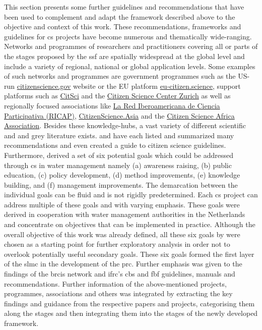 This section presents some further guidelines and recommendations that have been used to complement and adapt the framework described above to the objective and context of this work. These recommendations, frameworks and guidelines for \acrlong{cs} projects have become numerous and thematically wide-ranging. Networks and programmes of researchers and practitioners covering all or parts of the stages proposed by the \acrshort{ssf} are spatially widespread at the global level and include a variety of regional, national or global application levels. Some examples of such networks and programmes are government programmes such as the US-run \href{https://www.citizenscience.gov/}{citizenscience.gov} website or the EU platform \href{https://eu-citizen.science/}{eu-citizen.science}, support platforms such as \href{https://citsci.org/}{CitSci} and the \href{https://citizenscience.ch/en/}{Citizen Science Center Zurich} as well as regionally focused associations like \href{http://cienciaparticipativa.net/la-ricap/}{La Red Iberoamericana de Ciencia Participativa (RICAP)}, \href{https://citizenscience.asia/}{CitizenScience.Asia} and the \href{https://www.usiu.ac.ke/citsci-africa-association/}{Citizen Science Africa Association}.\newline
Besides these knowledge-hubs, a vast variety of different scientific and and grey literature exists. \Textcite{fraislCitizenScienceEnvironmental2022} and \textcite{westonCommunityBasedWaterMonitoring2015} have each listed and summarized many recommendations and \textcite{garciaFindingWhatYou2021} even created a guide to citizen science guidelines.\newline
Furthermore, \textcite{minkmanCitizenScienceWater2015} derived a set of six potential goals which could be addressed through \acrlong{cs} in water management namely (a) awareness raising, (b) public education, (c) policy development, (d) method improvements, (e) knowledge building, and (f) management improvements. The demarcation between the individual goals can be fluid and is not rigidly predetermined. Each \acrshort{cs} project can address multiple of these goals and with varying emphasis. These goals were derived in cooperation with water management authorities in the Netherlands and concentrate on objectives that can be implemented in practice.\newline
Although the overall objective of this work was already defined, all these six goals by \textcite{minkmanCitizenScienceWater2015}were chosen as a starting point for further exploratory analysis in order not to overlook potentially useful secondary goals. These six goals formed the first layer of the \acrshort{slmc} in the development of the \acrshort{prc}. Further emphasis was given to the findings of the \acrshort{brcis} network and \acrshort{ifrc}'s \acrshort{cbs} and \acrshort{fbf} guidelines, manuals and recommendations. Further information of the above-mentioned projects, programmes, associations and others was integrated by extracting the key findings and guidance from the respective papers and projects, categorising them along the stages and then integrating them into the stages of the newly developed framework.

